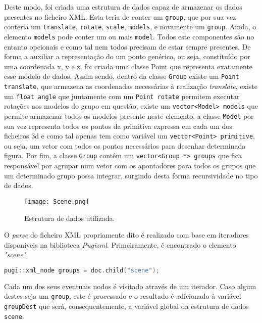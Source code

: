\documentclass[a4paper]{article}
\begin{document}
Deste modo, foi criada uma estrutura de dados capaz de armazenar os dados presentes no ficheiro XML. Esta teria de conter um \texttt{group}, que por sua vez conteria um \texttt{translate}, \texttt{rotate}, \texttt{scale}, \texttt{models}, e novamente um \texttt{group}. Ainda, o elemento \texttt{models} pode conter um ou mais \texttt{model}. Todos este componentes são no entanto opcionais e como tal nem todos precisam de estar sempre presentes. De forma a auxiliar a representação do um ponto genérico, ou seja, constituído por uma coordenada x, y e z, foi criada uma classe Point que representa exatamente esse modelo de dados. Assim sendo, dentro da classe \texttt{Group} existe um \texttt{Point translate}, que armazena as coordenadas necessárias à realização \textit{translate}, existe um \texttt{float angle} que juntamente com um \texttt{Point rotate} permitem executar rotações aos modelos do grupo em questão, existe um \texttt{vector<Model> models} que permite armazenar todos os modelos presente neste elemento, a classe \texttt{Model} por sua vez representa todos os pontos da primitiva expressa em cada um dos ficheiros 3d e como tal apenas tem como variável um \texttt{vector<Point> primitive}, ou seja, um vetor com todos os pontos necessários para desenhar determinada figura. Por fim, a classe \texttt{Group} contém um \texttt{vector<Group *> groups} que fica responsável por agrupar num vetor com os apontadores para todos os grupos que um determinado grupo possa integrar, surgindo desta forma recursividade no tipo de dados. 

\begin{figure}[h]
    \centering
    \texttt{[image: Scene.png]}
    \caption{Estrutura de dados utilizada.}
    \label{fig:classses}
\end{figure}

O \textit{parse} do ficheiro XML propriamente dito é realizado com base em iteradores disponíveis na biblioteca \textit{Pugixml}. Primeiramente, é encontrado o elemento \textit{"scene"}.

\begin{lstlisting}[language=C++, caption=Elemento \textit{scene}.]
    pugi::xml_node groups = doc.child("scene");
\end{lstlisting}

Cada um dos seus eventuais nodos é visitado através de um iterador. Caso algum destes seja um \texttt{group}, este é processado e o resultado é adicionado à variável \texttt{groupDest} que será, consequentemente, a variável global da estrutura de dados \texttt{scene}.
\end{document}
